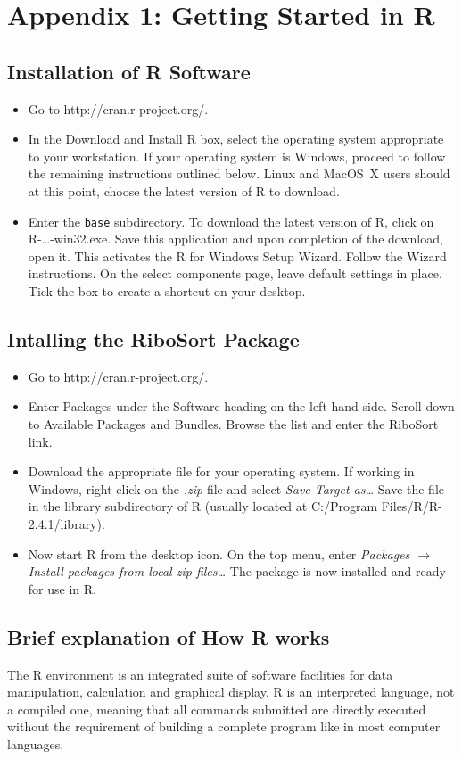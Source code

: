 \documentclass[a4paper]{article}
\begin{document}
\section{Appendix 1: Getting Started in R}
\subsection{Installation of R Software}
\begin{itemize}
\item Go to http://cran.r-project.org/.
\item In the Download and Install R box, select the operating system appropriate to your workstation. If your operating system is Windows, proceed to follow the remaining instructions outlined below. Linux and MacOS~X users should at this point, choose the latest version of R to download.
\item Enter the \texttt{base} subdirectory. To download the latest version of R, click on R-\ldots-win32.exe. Save this application and upon completion of the download, open it. This activates the R for Windows Setup Wizard. Follow the Wizard instructions. On the select components page, leave default settings in place. Tick the box to create a shortcut on your desktop.
\end{itemize}

\subsection{Intalling the RiboSort Package}
\begin{itemize}
\item Go to http://cran.r-project.org/.
\item Enter Packages under the Software heading on the left hand side. Scroll down to Available Packages and Bundles. Browse the list and enter the RiboSort link.
\item Download the appropriate file for your operating system. If working in Windows, right-click on the \textit{.zip} file and select \textit{Save Target as\ldots} Save the file in the library subdirectory of R (usually located at C:/Program Files/R/R-2.4.1/library).
\item Now start R from the desktop icon. On the top menu, enter {\em Packages $\rightarrow$ Install packages from local zip files\ldots} The package is now installed and ready for use in R.
\end{itemize}

\subsection{Brief explanation of How R works}
The R environment is an integrated suite of software facilities for data manipulation, calculation and graphical display. R is an interpreted language, not a compiled one, meaning that all commands submitted are directly executed without the requirement of building a complete program like in most computer languages. 
\end{document}
